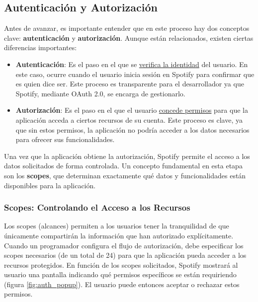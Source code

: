 \subsection{Autenticación y Autorización}

Antes de avanzar, es importante entender que en este proceso hay dos conceptos clave: \textbf{autenticación} y \textbf{autorización}. Aunque están relacionados, existen ciertas diferencias importantes:

\begin{itemize}
    \item \textbf{Autenticación}: Es el paso en el que se \underline{verifica la identidad} del usuario. En este caso, ocurre cuando el usuario inicia sesión en Spotify para confirmar que es quien dice ser. Este proceso es transparente para el desarrollador ya que Spotify, mediante OAuth 2.0, se encarga de gestionarlo.
    \item \textbf{Autorización}: Es el paso en el que el usuario \underline{concede permisos} para que la aplicación acceda a ciertos recursos de su cuenta. Este proceso es clave, ya que sin estos permisos, la aplicación no podría acceder a los datos necesarios para ofrecer sus funcionalidades.
\end{itemize}

Una vez que la aplicación obtiene la autorización, Spotify permite el acceso a los datos solicitados de forma controlada. Un concepto fundamental en esta etapa son los \textbf{scopes}, que determinan exactamente qué datos y funcionalidades están disponibles para la aplicación.

\subsubsection*{Scopes: Controlando el Acceso a los Recursos}

Los scopes (alcances) permiten a los usuarios tener la tranquilidad de que únicamente compartirán la información que han autorizado explícitamente. Cuando un programador configura el flujo de autorización, debe especificar los scopes necesarios (de un total de 24) para que la aplicación pueda acceder a los recursos protegidos. En función de los scopes solicitados, Spotify mostrará al usuario una pantalla indicando qué permisos específicos se están requiriendo (figura \ref{fig:auth_popup}). El usuario puede entonces aceptar o rechazar estos permisos.

